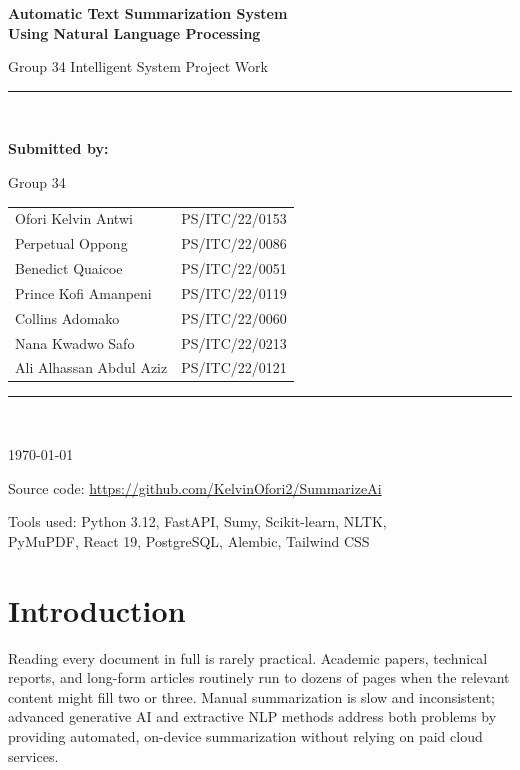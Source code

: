 \documentclass[12pt,a4paper]{article}
\begin{document}
\begin{titlepage}
  \centering
  \vspace*{2cm}
  {\LARGE\bfseries Automatic Text Summarization System\\Using Natural Language Processing\par}
  \vspace{1cm}
  {\large Group 34 Intelligent System Project Work\par}
  \vspace{2cm}
  \rule{0.6\textwidth}{0.4pt}\\[0.4cm]
  {\large\bfseries Submitted by:\par}
  \vspace{0.3cm}
  {\large Group 34\par}
  \vspace{0.5cm}
  \begin{tabular}{ll}
    Ofori Kelvin Antwi & PS/ITC/22/0153 \\
    Perpetual Oppong & PS/ITC/22/0086 \\
    Benedict Quaicoe & PS/ITC/22/0051 \\
    Prince Kofi Amanpeni & PS/ITC/22/0119 \\
    Collins Adomako & PS/ITC/22/0060 \\
    Nana Kwadwo Safo & PS/ITC/22/0213 \\
    Ali Alhassan Abdul Aziz & PS/ITC/22/0121 \\
  \end{tabular}
  \vspace{1.5cm}
  \rule{0.6\textwidth}{0.4pt}\\[0.8cm]
  {\normalsize \today\par}
  \vspace{1cm}
  {\small Source code: \url{https://github.com/KelvinOfori2/SummarizeAi}\par}
  \vfill
  {\small
    Tools used: Python 3.12, FastAPI, Sumy, Scikit-learn, NLTK,\\
    PyMuPDF, React 19, PostgreSQL, Alembic, Tailwind CSS
  }
\end{titlepage}

\tableofcontents
\newpage

\section{Introduction}

Reading every document in full is rarely practical. Academic papers, technical reports, and long-form articles routinely run to dozens of pages when the relevant content might fill two or three. Manual summarization is slow and inconsistent; advanced generative AI and extractive NLP methods address both problems by providing automated, on-device summarization without relying on paid cloud services.
\end{document}
